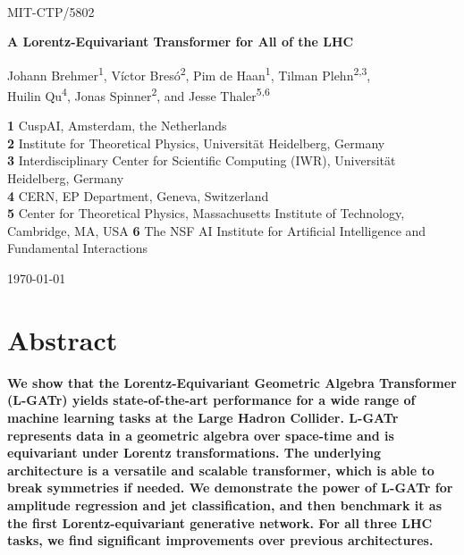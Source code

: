 \documentclass[submission, Phys]{SciPost}
\begin{document}

~\vspace{-0.45in}

\hfill {\footnotesize MIT-CTP/5802}

\vspace{0.15in}

\begin{center}
 {\Large \textbf{A Lorentz-Equivariant Transformer for All of the LHC}}
\end{center}

\begin{center}
Johann Brehmer\textsuperscript{1},
Víctor Bresó\textsuperscript{2},
Pim de Haan\textsuperscript{1},
Tilman Plehn\textsuperscript{2,3}, \\
Huilin Qu\textsuperscript{4},
Jonas Spinner\textsuperscript{2}, and
Jesse Thaler\textsuperscript{5,6}
\end{center}

\begin{center}
{\bf 1} CuspAI, Amsterdam, the Netherlands \\
{\bf 2} Institute for Theoretical Physics, Universit\"at Heidelberg, Germany \\
{\bf 3} Interdisciplinary Center for Scientific Computing (IWR), Universit\"at Heidelberg, Germany \\
{\bf 4} CERN, EP Department, Geneva, Switzerland \\
{\bf 5} Center for Theoretical Physics, Massachusetts Institute of Technology, Cambridge, MA, USA
{\bf 6} The NSF AI Institute for Artificial Intelligence and Fundamental Interactions
\end{center}

\begin{center}
\today
\end{center}

\section*{Abstract}
{\bf
We show that the Lorentz-Equivariant Geometric Algebra Transformer (L-GATr) yields state-of-the-art performance for a wide range of machine learning tasks at the Large Hadron Collider.
%
L-GATr represents data in a geometric algebra over space-time and is equivariant under Lorentz transformations.
%
The underlying architecture is a versatile and scalable transformer, which is able to break symmetries if needed.
%
We demonstrate the power of L-GATr for amplitude regression and jet classification, and then benchmark it as the first Lorentz-equivariant generative network.
%
For all three LHC tasks, we find significant improvements over previous architectures.
}
\end{document}
